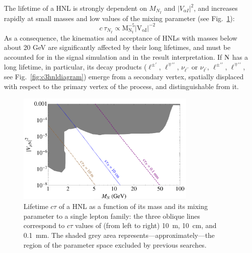 The lifetime of a HNL is strongly dependent on $M_{N_I}$ and $|V_{\alpha I}|^2$,
and increases rapidly at small masses and low values of the mixing
parameter (see Fig.~\ref{fig:hnlLifetime}):
\begin{equation}
\label{eq:lifetimedependences}
c\:\tau_{N_{I}} \propto\mathrm{M_{N_I}^{-5}|V_{\alpha I}|^{-2}}
\end{equation}
As a consequence, the kinematics and acceptance of HNLs with masses
below about 20 GeV are significantly affected by their long lifetimes,
and must be accounted for in the signal simulation and in the result
interpretation.
If $\mathrm{N}$ has a long lifetime, in particular, its decay products
($\ell^{\pm\prime}$, $\ell^{\mp\prime\prime}$, $\nu_{\ell^{\prime\prime}}$ or
$\nu_{\ell^{\prime}}$, $\ell^{\pm\prime\prime}$, $\ell^{\mp\prime\prime}$, see Fig.~\ref{fig:c3hnldiagram})
emerge from a secondary vertex, spatially displaced with respect to
the primary vertex of the process, and distinguishable from it.
\begin{figure}
\centering
\includegraphics[width=0.78\textwidth]{Figures/c3/graph_displ.png}
\caption{Lifetime $c\tau$ of a HNL as a function of its mass \mhnl
and its mixing parameter \mixpar to a single lepton family:
the three oblique lines correspond to $c\tau$ values of (from left to
right) 10~m,  10~cm, and 0.1~mm.
The shaded grey area represents---approximately---the region of the
parameter space excluded by previous searches.}
\label{fig:hnlLifetime}
\end{figure}


\vspace{5mm} 
